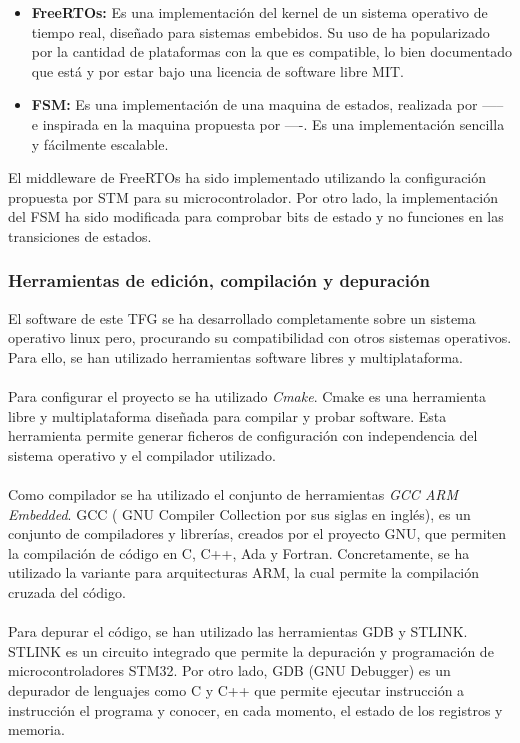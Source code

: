 			\begin{itemize}
				\item \textbf{FreeRTOs: } Es una implementación del kernel de un sistema operativo de tiempo real, diseñado para sistemas embebidos. Su uso de ha popularizado por la cantidad de plataformas con la que es compatible, lo bien documentado que está y por estar bajo una licencia de software libre MIT. 
				\item \textbf{FSM: } Es una implementación de una maquina de estados, realizada por ----- e inspirada en la maquina propuesta por ----. Es una implementación sencilla y fácilmente escalable.
			\end{itemize}

				
				El middleware de FreeRTOs ha sido implementado utilizando la configuración propuesta por STM para su microcontrolador. Por otro lado, la implementación del FSM ha sido modificada para comprobar bits de estado y no funciones en las transiciones de estados.
			
		\subsubsection{Herramientas de edición, compilación y depuración} \label{soft:debugApp}
		
		El software de este TFG se ha desarrollado completamente sobre un sistema operativo linux pero, procurando su compatibilidad con otros sistemas operativos. Para ello, se han utilizado herramientas software libres y multiplataforma.
	\paragraph{}
	Para configurar el proyecto se ha utilizado \textit{Cmake}. Cmake es una herramienta libre y multiplataforma diseñada para compilar y probar software. Esta herramienta permite generar ficheros de configuración con independencia del sistema operativo y el compilador utilizado. 
	\paragraph{}
	Como compilador se ha utilizado el conjunto de herramientas \textit{GCC ARM Embedded}. GCC ( GNU Compiler Collection por sus siglas en inglés), es un conjunto de compiladores y librerías, creados por el proyecto GNU, que permiten la compilación de código en C, C++, Ada y Fortran. Concretamente, se ha utilizado la variante para arquitecturas ARM, la cual permite la compilación cruzada del código.
	\paragraph{}
	Para depurar el código, se han utilizado las herramientas GDB y STLINK. STLINK es un circuito integrado que permite la depuración y programación de microcontroladores STM32. Por otro lado, GDB (GNU Debugger) es un depurador de lenguajes como C y C++ que permite ejecutar instrucción a instrucción el programa y conocer, en cada momento, el estado de los registros y memoria. 
	
